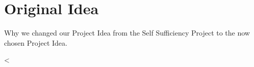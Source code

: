 \chapter{Original Idea}
\label{chap:Original_Idea}

Why we changed our Project Idea from the Self Sufficiency Project to the now chosen Project Idea.

<